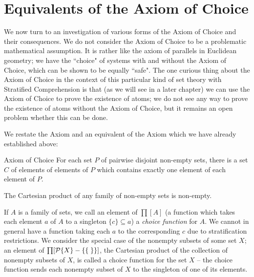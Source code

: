 \chapter[The Axiom of Choice]{Equivalents of the Axiom of Choice}


We now turn to an investigation of various forms of the Axiom
of Choice and their consequences.  We do not consider the Axiom of
Choice to be a problematic mathematical assumption.  It is rather like
the axiom of parallels in Euclidean geometry; we have the ``choice" of
systems with and without the Axiom of Choice, which can be shown to be
equally ``safe".  The one curious thing about the Axiom of Choice in the context of this particular kind of set theory with Stratified
Comprehension is that (as we will see
in a later chapter) we can use the Axiom of Choice to prove the existence of
atoms; we do not see any way to prove the existence of atoms
without the Axiom of Choice, but it remains an open problem whether this can be
done. 

We restate the Axiom and an equivalent of the Axiom which we
have already established above:

\begin{axiom}{Axiom of Choice}
 For each set $P$ of pairwise disjoint non-empty
 sets, there is a set $C$ of elements of elements of $P$ which contains
 exactly one element of each element of $P$.
\end{axiom}

\begin{thm}
 The Cartesian product of any family of non-empty sets
 is non-empty.
\end{thm}

If $A$ is a family of sets, we call an element of $\prod[A]$ (a
function which takes each element $a$ of $A$ to a
singleton $\{c\} \subseteq a$) a
{\itshape choice function\/} for $A$.  We cannot in general have a function
taking each $a$ to 
the corresponding $c$ due to stratification restrictions.
We consider the special case of the nonempty subsets of some set
$X$; an element of $\prod[{\cal P}\{X\} - \{\mbox{$\{\;\}$}\}]$, the
Cartesian product of the collection of nonempty 
subsets of $X$, is called a choice function for
the set $X$ -- the choice function sends each nonempty subset of $X$ to the
singleton of one of its elements.

